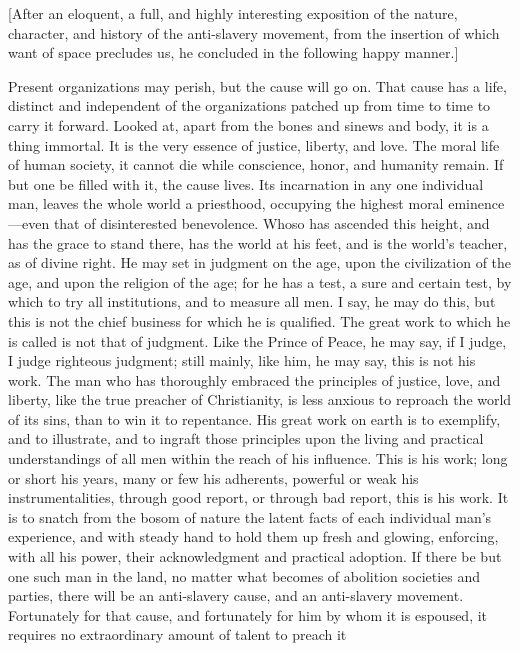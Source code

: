 {{[}After an eloquent, a full, and highly interesting exposition of the
nature, character, and history of the anti-slavery movement, from the
insertion of which want of space precludes us, he concluded in the
following happy manner.{]}}

Present organizations may perish, but the cause will go on. That cause
has a life, distinct and independent of the organizations patched up
from time to time to carry it forward. Looked at, apart from the bones
and sinews and body, it is a thing immortal. It is the very essence of
justice, liberty, and love. The moral life of human society, it cannot
die while conscience, honor, and humanity remain. If but one be filled
with it, the cause lives. Its incarnation in any one individual man,
leaves the whole world a priesthood, occupying the highest moral
eminence---even that of disinterested benevolence. Whoso has ascended
this height, and has the grace to stand there, has the world at his
feet, and is the world's teacher, as of divine right. He may set in
judgment on the age, upon the civilization of the age, and upon the
religion of the age; for he has a test, a sure and certain test, by
which to try all institutions, and to measure all men. I say, he may do
this, but this is not the chief business for which he is qualified. The
great work to which he is called is not that of judgment. Like the
Prince of Peace, he may say, if I judge, I judge righteous judgment;
still mainly, like him, he may say, this is not his work. The man who
has thoroughly embraced the principles of justice, love, and liberty,
like the true preacher of Christianity, is less anxious to reproach the
world of its sins, than to win it to repentance. His
{\protect\hypertarget{460}{}{}}great work on earth is to exemplify, and
to illustrate, and to ingraft those principles upon the living and
practical understandings of all men within the reach of his influence.
This is his work; long or short his years, many or few his adherents,
powerful or weak his instrumentalities, through good report, or through
bad report, this is his work. It is to snatch from the bosom of nature
the latent facts of each individual man's experience, and with steady
hand to hold them up fresh and glowing, enforcing, with all his power,
their acknowledgment and practical adoption. If there be but one such
man in the land, no matter what becomes of abolition societies and
parties, there will be an anti-slavery cause, and an anti-slavery
movement. Fortunately for that cause, and fortunately for him by whom it
is espoused, it requires no extraordinary amount of talent to preach it
